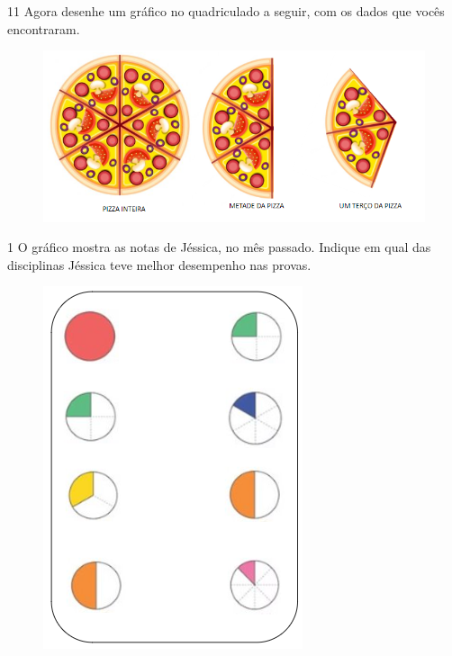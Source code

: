\num{11} Agora desenhe um gráfico no quadriculado a seguir, com os dados que vocês
encontraram.

\begin{figure}[htpb!]
\centering
\includegraphics[width=.6\textwidth]{./media/image99.png}
\end{figure}



\num{1} O gráfico mostra as notas de Jéssica, no mês passado. Indique em
qual das disciplinas Jéssica teve melhor desempenho nas provas.

\begin{figure}[htpb!]
\includegraphics[width=\textwidth]{./media/image100.png}
\end{figure}

